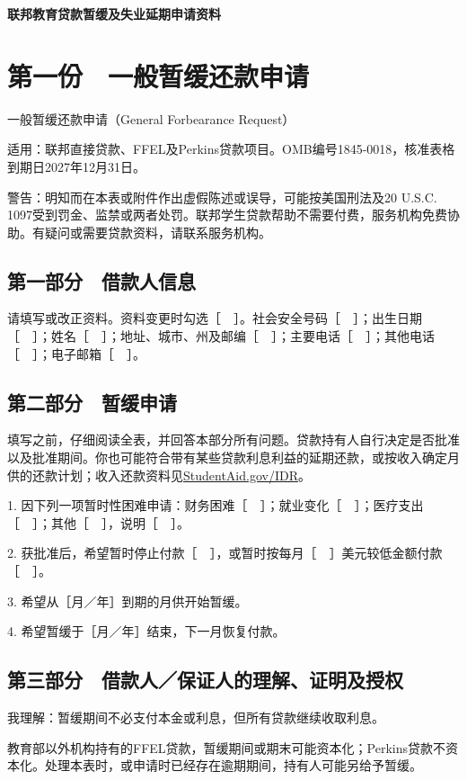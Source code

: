 \documentclass[UTF8,fontset=none,11pt,a4paper]{ctexart}
\begin{document}
{\noindent\LARGE\bfseries 联邦教育贷款暂缓及失业延期申请资料\par}
\vspace{10pt}
\section*{第一份　一般暂缓还款申请}
一般暂缓还款申请（General Forbearance Request）


适用：联邦直接贷款、FFEL及Perkins贷款项目。OMB编号1845-0018，核准表格到期日2027年12月31日。


警告：明知而在本表或附件作出虚假陈述或误导，可能按美国刑法及20 U.S.C. 1097受到罚金、监禁或两者处罚。联邦学生贷款帮助不需要付费，服务机构免费协助。有疑问或需要贷款资料，请联系服务机构。


\subsection*{第一部分　借款人信息}
请填写或改正资料。资料变更时勾选［　］。社会安全号码［　］；出生日期［　］；姓名［　］；地址、城市、州及邮编［　］；主要电话［　］；其他电话［　］；电子邮箱［　］。


\subsection*{第二部分　暂缓申请}
填写之前，仔细阅读全表，并回答本部分所有问题。贷款持有人自行决定是否批准以及批准期间。你也可能符合带有某些贷款利息利益的延期还款，或按收入确定月供的还款计划；收入还款资料见\url{StudentAid.gov/IDR}。


1. 因下列一项暂时性困难申请：财务困难［　］；就业变化［　］；医疗支出［　］；其他［　］，说明［　］。


2. 获批准后，希望暂时停止付款［　］，或暂时按每月［　］美元较低金额付款［　］。


3. 希望从［月／年］到期的月供开始暂缓。


4. 希望暂缓于［月／年］结束，下一月恢复付款。


\subsection*{第三部分　借款人／保证人的理解、证明及授权}
我理解：暂缓期间不必支付本金或利息，但所有贷款继续收取利息。


教育部以外机构持有的FFEL贷款，暂缓期间或期末可能资本化；Perkins贷款不资本化。处理本表时，或申请时已经存在逾期期间，持有人可能另给予暂缓。
\end{document}
